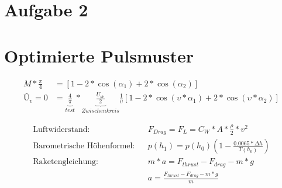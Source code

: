 \documentclass[a4paper,11pt,oneside]{book}
\begin{document}
\section{Aufgabe 2}
\section{Optimierte Pulsmuster}

\begin{subequations} \label{eq:equations}
\begin{align}
M*\frac{\pi}{4} &= [1-2*\cos(\alpha_1)+2*\cos(\alpha_2)]
\label{eq:pulsmuster1}\\
Û_v = 0 &= \underbrace{\frac{4}{\pi}}_{test}*\underbrace{\frac{U_{dc}}{2}}_{Zwischenkreis}\frac{1}{\upsilon}[1-2*\cos(\upsilon*\alpha_1)+2*\cos(\upsilon*\alpha_2)]
\label{eq:pulsmuster2}
\end{align}
\end{subequations}





\begin{align}
\text{Luftwiderstand:} &&
F_{Drag}=F_L=C_W*A*\frac{\rho}{2}*v^2
\label{eq:Luftwiderstand}\\
\text{Barometrische Höhenformel:} &&
p(h_1)=p(h_0)(1-\frac{0.0065*\Delta h}{T(h_0)} )
\label{eq:BarometrischeHoehenformel}\\
\text{Raketengleichung:} &&
m*a=F_{thrust}-F_{drag}-m*g\\
&&
a=\frac{F_{thrust}-F_{drag}-m*g}{m}
\label{eq:Raketengleichung}
\end{align}

\clearpage
\end{document}
